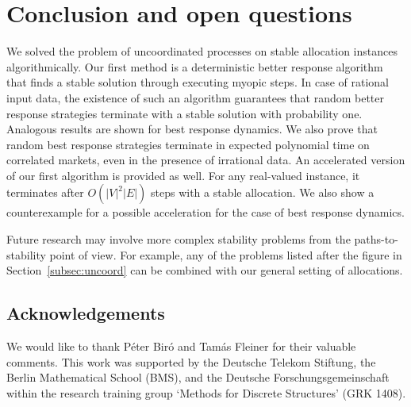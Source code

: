 \documentclass{llncs}
\begin{document}
\section*{Conclusion and open questions}

We solved the problem of uncoordinated processes on stable allocation instances algorithmically. Our first method is a deterministic better response algorithm that finds a stable solution through executing myopic steps. In case of rational input data, the existence of such an algorithm guarantees that random better response strategies terminate with a stable solution with probability one. Analogous results are shown for best response dynamics. We also prove that random best response strategies terminate in expected polynomial time on correlated markets, even in the presence of irrational data. An accelerated version of our first algorithm is provided as well. For any real-valued instance, it terminates after $O(|V|^2|E|)$ steps with a stable allocation. We also show a counterexample for a possible acceleration for the case of best response dynamics.

Future research may involve more complex stability problems from the paths-to-stability point of view. For example, any of the problems listed after the figure in Section~\ref{subsec:uncoord} can be combined with our general setting of allocations.

\subsection*{Acknowledgements}

We would like to thank P\'eter Bir\'o and Tam\'as Fleiner for their valuable comments. This work was supported by the Deutsche Telekom Stiftung, the Berlin Mathematical School (BMS), and the Deutsche Forschungsgemeinschaft within the research training group `Methods for Discrete Structures' (GRK 1408).




\end{document}
